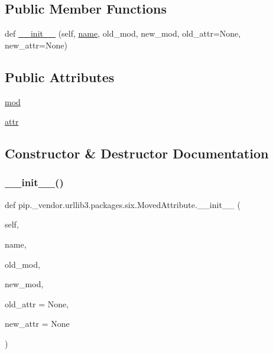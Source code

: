 \subsection*{Public Member Functions}
\begin{DoxyCompactItemize}
\item 
def \hyperlink{classpip_1_1__vendor_1_1urllib3_1_1packages_1_1six_1_1MovedAttribute_ab4e9f5b99ec6c1bc1d572aa35314ecb3}{\+\_\+\+\_\+init\+\_\+\+\_\+} (self, \hyperlink{classpip_1_1__vendor_1_1urllib3_1_1packages_1_1six_1_1__LazyDescr_ab59648d566d3274f298247937875a268}{name}, old\+\_\+mod, new\+\_\+mod, old\+\_\+attr=None, new\+\_\+attr=None)
\end{DoxyCompactItemize}
\subsection*{Public Attributes}
\begin{DoxyCompactItemize}
\item 
\hyperlink{classpip_1_1__vendor_1_1urllib3_1_1packages_1_1six_1_1MovedAttribute_a65686dee431b7b02dbbf844177058bd2}{mod}
\item 
\hyperlink{classpip_1_1__vendor_1_1urllib3_1_1packages_1_1six_1_1MovedAttribute_af26650661440da313f32e9d0a0e302a8}{attr}
\end{DoxyCompactItemize}


\subsection{Constructor \& Destructor Documentation}
\mbox{\label{classpip_1_1__vendor_1_1urllib3_1_1packages_1_1six_1_1MovedAttribute_ab4e9f5b99ec6c1bc1d572aa35314ecb3}} 
\subsubsection{\texorpdfstring{\+\_\+\+\_\+init\+\_\+\+\_\+()}{\_\_init\_\_()}}
{\footnotesize\ttfamily def pip.\+\_\+vendor.\+urllib3.\+packages.\+six.\+Moved\+Attribute.\+\_\+\+\_\+init\+\_\+\+\_\+ (\begin{DoxyParamCaption}\item[{}]{self,  }\item[{}]{name,  }\item[{}]{old\+\_\+mod,  }\item[{}]{new\+\_\+mod,  }\item[{}]{old\+\_\+attr = {\ttfamily None},  }\item[{}]{new\+\_\+attr = {\ttfamily None} }\end{DoxyParamCaption})}



